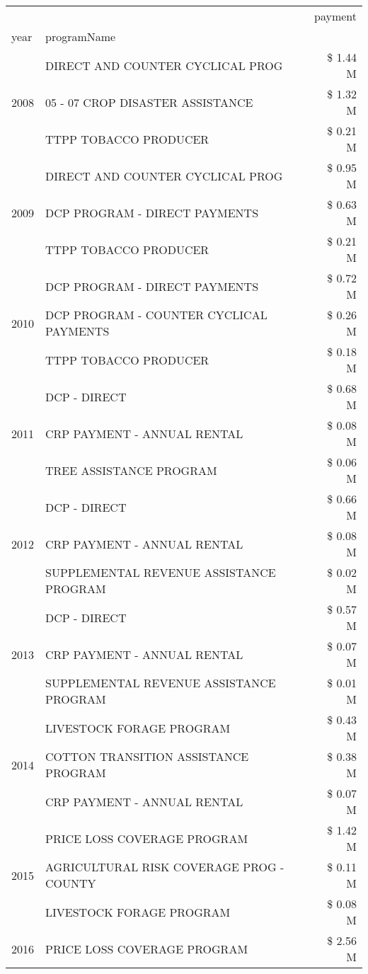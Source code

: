 \begin{tabular}{llr}
\toprule
 &  & payment \\
year & programName &  \\
\midrule
\multirow[t]{3}{*}{2008} & DIRECT AND COUNTER CYCLICAL PROG & \$ 1.44 M \\
 & 05 - 07 CROP DISASTER ASSISTANCE & \$ 1.32 M \\
 & TTPP TOBACCO PRODUCER & \$ 0.21 M \\
\cline{1-3}
\multirow[t]{3}{*}{2009} & DIRECT AND COUNTER CYCLICAL PROG & \$ 0.95 M \\
 & DCP PROGRAM - DIRECT PAYMENTS & \$ 0.63 M \\
 & TTPP TOBACCO PRODUCER & \$ 0.21 M \\
\cline{1-3}
\multirow[t]{3}{*}{2010} & DCP PROGRAM - DIRECT PAYMENTS & \$ 0.72 M \\
 & DCP PROGRAM - COUNTER CYCLICAL PAYMENTS & \$ 0.26 M \\
 & TTPP TOBACCO PRODUCER & \$ 0.18 M \\
\cline{1-3}
\multirow[t]{3}{*}{2011} & DCP - DIRECT & \$ 0.68 M \\
 & CRP PAYMENT - ANNUAL RENTAL & \$ 0.08 M \\
 & TREE ASSISTANCE PROGRAM & \$ 0.06 M \\
\cline{1-3}
\multirow[t]{3}{*}{2012} & DCP - DIRECT & \$ 0.66 M \\
 & CRP PAYMENT - ANNUAL RENTAL & \$ 0.08 M \\
 & SUPPLEMENTAL REVENUE ASSISTANCE PROGRAM & \$ 0.02 M \\
\cline{1-3}
\multirow[t]{3}{*}{2013} & DCP - DIRECT & \$ 0.57 M \\
 & CRP PAYMENT - ANNUAL RENTAL & \$ 0.07 M \\
 & SUPPLEMENTAL REVENUE ASSISTANCE PROGRAM & \$ 0.01 M \\
\cline{1-3}
\multirow[t]{3}{*}{2014} & LIVESTOCK FORAGE PROGRAM & \$ 0.43 M \\
 & COTTON TRANSITION ASSISTANCE PROGRAM & \$ 0.38 M \\
 & CRP PAYMENT - ANNUAL RENTAL & \$ 0.07 M \\
\cline{1-3}
\multirow[t]{3}{*}{2015} & PRICE LOSS COVERAGE PROGRAM & \$ 1.42 M \\
 & AGRICULTURAL RISK COVERAGE PROG - COUNTY & \$ 0.11 M \\
 & LIVESTOCK FORAGE PROGRAM & \$ 0.08 M \\
\cline{1-3}
\multirow[t]{3}{*}{2016} & PRICE LOSS COVERAGE PROGRAM                   & \$ 2.56 M \\

\end{tabular}
